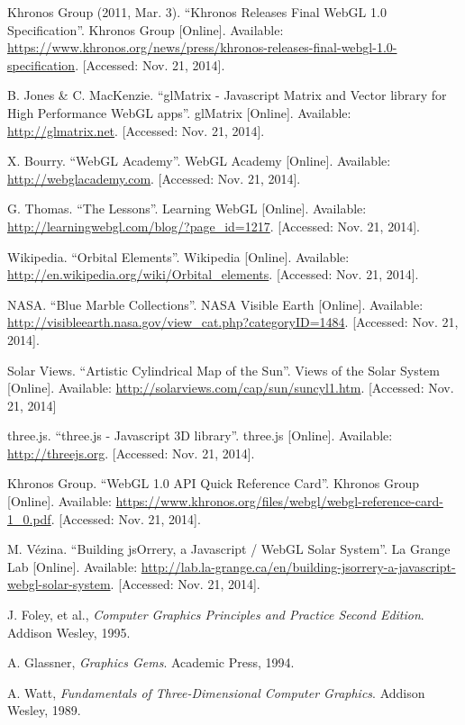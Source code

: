 \documentclass{scrreprt}
\begin{document}
\begin{thebibliography}{9}

        Khronos Group (2011, Mar. 3). ``Khronos Releases Final WebGL 1.0 Specification''. Khronos Group [Online].
        Available: \url{https://www.khronos.org/news/press/khronos-releases-final-webgl-1.0-specification}. [Accessed: Nov. 21, 2014].

        B. Jones \& C. MacKenzie. ``glMatrix - Javascript Matrix and Vector library for High Performance WebGL apps''. glMatrix [Online].
        Available: \url{http://glmatrix.net}. [Accessed: Nov. 21, 2014].

        X. Bourry. ``WebGL Academy''. WebGL Academy [Online].
        Available: \url{http://webglacademy.com}. [Accessed: Nov. 21, 2014].

        G. Thomas. ``The Lessons''. Learning WebGL [Online].
        Available: \url{http://learningwebgl.com/blog/?page_id=1217}. [Accessed: Nov. 21, 2014].
        
        Wikipedia. ``Orbital Elements''. Wikipedia [Online].
        Available: \url{http://en.wikipedia.org/wiki/Orbital_elements}. [Accessed: Nov. 21, 2014].

        NASA. ``Blue Marble Collections''. NASA Visible Earth [Online].
        Available: \url{http://visibleearth.nasa.gov/view_cat.php?categoryID=1484}. [Accessed: Nov. 21, 2014].
        
        Solar Views. ``Artistic Cylindrical Map of the Sun''. Views of the Solar System [Online].
        Available: \url{http://solarviews.com/cap/sun/suncyl1.htm}. [Accessed: Nov. 21, 2014]
        
        three.js. ``three.js - Javascript 3D library''. three.js [Online].
        Available: \url{http://threejs.org}. [Accessed: Nov. 21, 2014].

        Khronos Group. ``WebGL 1.0 API Quick Reference Card''. Khronos Group [Online].
        Available: \url{https://www.khronos.org/files/webgl/webgl-reference-card-1_0.pdf}. [Accessed: Nov. 21, 2014].

        M. V\'{e}zina. ``Building jsOrrery, a Javascript / WebGL Solar System''. La Grange Lab [Online].
        Available: \url{http://lab.la-grange.ca/en/building-jsorrery-a-javascript-webgl-solar-system}. [Accessed: Nov. 21, 2014].

        J. Foley, et al., \textit{Computer Graphics Principles and Practice Second Edition}. Addison Wesley, 1995.

        A. Glassner, \textit{Graphics Gems}. Academic Press, 1994.

        A. Watt, \textit{Fundamentals of Three-Dimensional Computer Graphics}. Addison Wesley, 1989.

\end{thebibliography}
\end{document}
